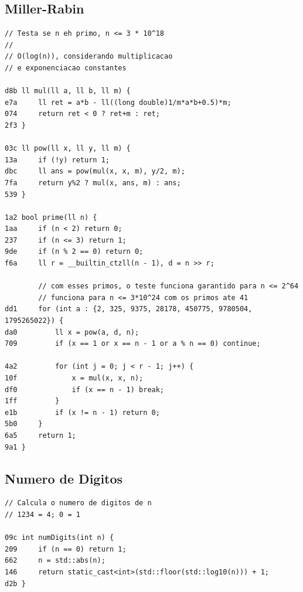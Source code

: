 \documentclass[11pt, a4paper, twoside]{article}
\begin{document}
\subsection{Miller-Rabin}
\begin{lstlisting}
// Testa se n eh primo, n <= 3 * 10^18
//
// O(log(n)), considerando multiplicacao
// e exponenciacao constantes

d8b ll mul(ll a, ll b, ll m) {
e7a 	ll ret = a*b - ll((long double)1/m*a*b+0.5)*m;
074 	return ret < 0 ? ret+m : ret;
2f3 }

03c ll pow(ll x, ll y, ll m) {
13a 	if (!y) return 1;
dbc 	ll ans = pow(mul(x, x, m), y/2, m);
7fa 	return y%2 ? mul(x, ans, m) : ans;
539 }

1a2 bool prime(ll n) {
1aa 	if (n < 2) return 0;
237 	if (n <= 3) return 1;
9de 	if (n % 2 == 0) return 0;
f6a 	ll r = __builtin_ctzll(n - 1), d = n >> r;
    
     	// com esses primos, o teste funciona garantido para n <= 2^64
    	// funciona para n <= 3*10^24 com os primos ate 41
dd1 	for (int a : {2, 325, 9375, 28178, 450775, 9780504, 1795265022}) {
da0 		ll x = pow(a, d, n);
709 		if (x == 1 or x == n - 1 or a % n == 0) continue;
    		
4a2 		for (int j = 0; j < r - 1; j++) {
10f 			x = mul(x, x, n);
df0 			if (x == n - 1) break;
1ff 		}
e1b 		if (x != n - 1) return 0;
5b0 	}
6a5 	return 1;
9a1 }
\end{lstlisting}

\subsection{Numero de Digitos}
\begin{lstlisting}
// Calcula o numero de digitos de n 
// 1234 = 4; 0 = 1

09c int numDigits(int n) {
209     if (n == 0) return 1;
662     n = std::abs(n);
146     return static_cast<int>(std::floor(std::log10(n))) + 1;
d2b }
\end{lstlisting}
\end{document}
